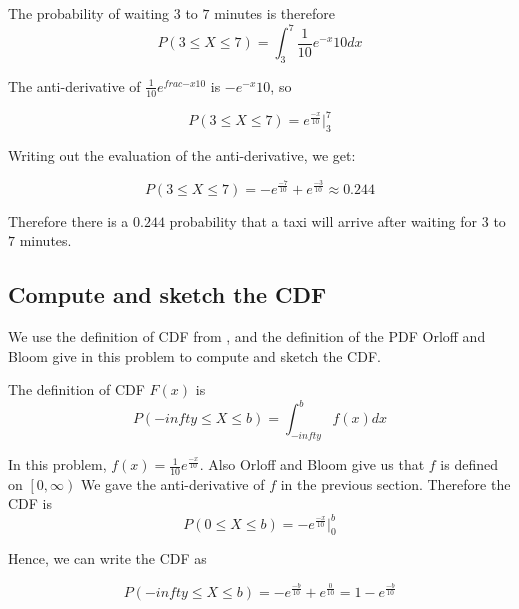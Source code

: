 \documentclass[a4paper,11pt]{article}
\begin{document}
The probability of waiting $3$ to $7$ minutes is therefore
\begin{equation}
P \left( 3 \leq X \leq 7 \right)
  = \int_{3}^{7} \frac{1}{10}e^{-x}{10} dx
\end{equation}

The anti-derivative of $\frac{1}{10}e^{frac{-x}{10}}$ is
$-e^{-x}{10}$, \cite{expInt} so

\begin{equation}
P \left( 3 \leq X \leq 7 \right)
  = e^{\frac{-x}{10}} \bigg\rvert_{3}^{7}
\end{equation}

Writing out the evaluation of the anti-derivative, we get:

\begin{equation}
P \left( 3 \leq X \leq 7 \right)
  = -e^{\frac{-7}{10}} + e^{\frac{-3}{10}} \approx 0.244
\end{equation}

Therefore there is a $0.244$ probability that a taxi will
arrive after waiting for $3$ to $7$ minutes.

\subsection{Compute and sketch the CDF}

We use the definition of CDF from \cite{reading5b}, and the definition
of the PDF Orloff and Bloom give in this problem to compute
and sketch the CDF.

The definition of CDF $F\left( x \right)$ is
\begin{equation}
P \left( -infty \leq X \leq b \right) = \int_{-infty}^{b} f \left( x \right) dx
\end{equation}

In this problem, $f \left( x \right) = \frac{1}{10}e^{\frac{-x}{10}}$. Also
Orloff and Bloom give us that $f$ is defined on $\left[ 0, \infty \right)$
We gave the anti-derivative of $f$ in the previous section.
Therefore the CDF is
\begin{equation}
P \left( 0 \leq X \leq b \right) = -e^{\frac{-x}{10}} \bigg\rvert_{0}^{b}
\end{equation}

Hence, we can write the CDF as

\begin{equation}
P \left( -infty \leq X \leq b \right)
  = -e^{\frac{-b}{10}} + e^{\frac{0}{10}}
  = 1 -e^{\frac{-b}{10}}
\end{equation}

\printbibliography{}
\end{document}
